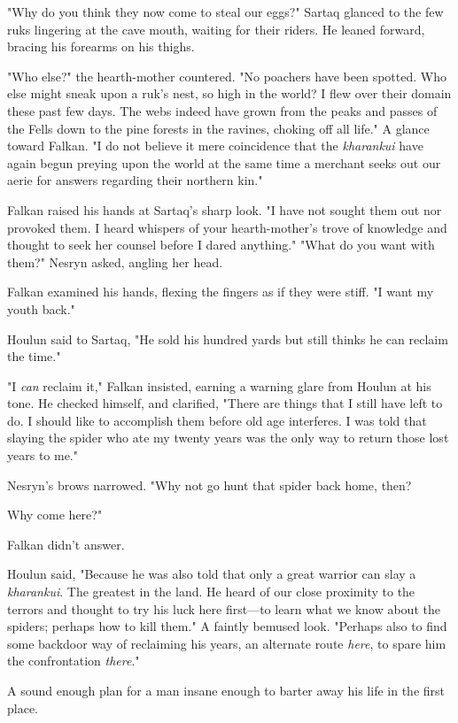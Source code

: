 "Why do you think they now come to steal our eggs?" Sartaq glanced to the few ruks lingering at the cave mouth, waiting for their riders. He leaned forward, bracing his forearms on his thighs.

"Who else?" the hearth-mother countered. "No poachers have been spotted. Who else might sneak upon a ruk's nest, so high in the world? I flew over their domain these past few days. The webs indeed have grown from the peaks and passes of the Fells down to the pine forests in the ravines, choking off all life." A glance toward Falkan. "I do not believe it mere coincidence that the \emph{kharankui} have again begun preying upon the world at the same time a merchant seeks out our aerie for answers regarding their northern kin."

Falkan raised his hands at Sartaq's sharp look. "I have not sought them out nor provoked them. I heard whispers of your hearth-mother's trove of knowledge and thought to seek her counsel before I dared anything." "What do you want with them?" Nesryn asked, angling her head.

Falkan examined his hands, flexing the fingers as if they were stiff. "I want my youth back."

Houlun said to Sartaq, "He sold his hundred yards but still thinks he can reclaim the time."

"I \emph{can} reclaim it," Falkan insisted, earning a warning glare from Houlun at his tone. He checked himself, and clarified, "There are
 things that I still have left to do. I should like to accomplish them before old age interferes. I was told that slaying the spider who ate my twenty years was the only way to return those lost years to me."

Nesryn's brows narrowed. "Why not go hunt that spider back home, then?

Why come here?"

Falkan didn't answer.

Houlun said, "Because he was also told that only a great warrior can slay a \emph{kharankui}. The greatest in the land. He heard of our close proximity to the terrors and thought to try his luck here first---to learn what we know about the spiders; perhaps how to kill them." A faintly bemused look. "Perhaps also to find some backdoor way of reclaiming his years, an alternate route \emph{here}, to spare him the confrontation \emph{there}."

A sound enough plan for a man insane enough to barter away his life in the first place.

